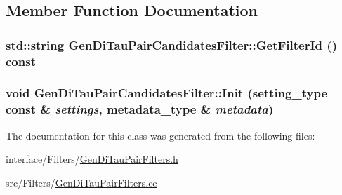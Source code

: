 \subsection{Member Function Documentation}
\hypertarget{classGenDiTauPairCandidatesFilter_afb40086e1d3bdca2f63c109064e0ed03}{
\subsubsection[{GetFilterId}]{\setlength{\rightskip}{0pt plus 5cm}std::string GenDiTauPairCandidatesFilter::GetFilterId () const}}
\label{classGenDiTauPairCandidatesFilter_afb40086e1d3bdca2f63c109064e0ed03}
\hypertarget{classGenDiTauPairCandidatesFilter_a3de66c0061604b156053712155f36b45}{
\subsubsection[{Init}]{\setlength{\rightskip}{0pt plus 5cm}void GenDiTauPairCandidatesFilter::Init (setting\_\-type const \& {\em settings}, \/  metadata\_\-type \& {\em metadata})}}
\label{classGenDiTauPairCandidatesFilter_a3de66c0061604b156053712155f36b45}


The documentation for this class was generated from the following files:\begin{DoxyCompactItemize}
\item 
interface/Filters/\hyperlink{GenDiTauPairFilters_8h}{GenDiTauPairFilters.h}\item 
src/Filters/\hyperlink{GenDiTauPairFilters_8cc}{GenDiTauPairFilters.cc}\end{DoxyCompactItemize}
